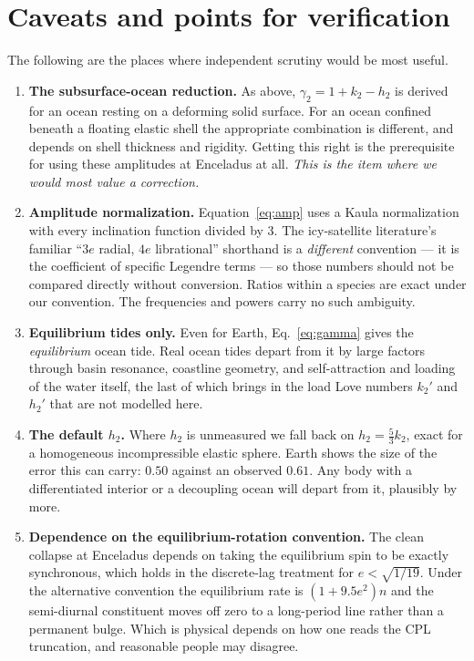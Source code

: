 \documentclass[11pt]{article}
\begin{document}
\section{Caveats and points for verification}
\label{sec:caveats}

The following are the places where independent scrutiny would be most useful.

\begin{enumerate}
\item \textbf{The subsurface-ocean reduction.} As above, $\gamma_2 = 1+k_2-h_2$
is derived for an ocean resting on a deforming solid surface. For an ocean
confined beneath a floating elastic shell the appropriate combination is
different, and depends on shell thickness and rigidity. Getting this right is
the prerequisite for using these amplitudes at Enceladus at all. \emph{This is
the item where we would most value a correction.}

\item \textbf{Amplitude normalization.} Equation~\eqref{eq:amp} uses a Kaula
normalization with every inclination function divided by 3. The icy-satellite
literature's familiar ``$3e$ radial, $4e$ librational'' shorthand is a
\emph{different} convention --- it is the coefficient of specific Legendre
terms --- so those numbers should not be compared directly without conversion.
Ratios within a species are exact under our convention. The frequencies and
powers carry no such ambiguity.

\item \textbf{Equilibrium tides only.} Even for Earth, Eq.~\eqref{eq:gamma}
gives the \emph{equilibrium} ocean tide. Real ocean tides depart from it by
large factors through basin resonance, coastline geometry, and self-attraction
and loading of the water itself, the last of which brings in the load Love
numbers $k_2'$ and $h_2'$ that are not modelled here.

\item \textbf{The default $h_2$.} Where $h_2$ is unmeasured we fall back on
$h_2 = \tfrac53 k_2$, exact for a homogeneous incompressible elastic sphere.
Earth shows the size of the error this can carry: $0.50$ against an observed
$0.61$. Any body with a differentiated interior or a decoupling ocean will
depart from it, plausibly by more.

\item \textbf{Dependence on the equilibrium-rotation convention.} The clean
collapse at Enceladus depends on taking the equilibrium spin to be exactly
synchronous, which holds in the discrete-lag treatment for $e < \sqrt{1/19}$.
Under the alternative convention the equilibrium rate is $(1+9.5e^2)n$ and the
semi-diurnal constituent moves off zero to a long-period line rather than a
permanent bulge. Which is physical depends on how one reads the CPL
truncation, and reasonable people may disagree.


\end{enumerate}
\end{document}
